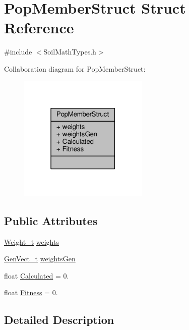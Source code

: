 \hypertarget{struct_pop_member_struct}{}\section{Pop\+Member\+Struct Struct Reference}
\label{struct_pop_member_struct}


{\ttfamily \#include $<$Soil\+Math\+Types.\+h$>$}



Collaboration diagram for Pop\+Member\+Struct\+:\nopagebreak
\begin{figure}[H]
\begin{center}
\leavevmode
\includegraphics[width=175pt]{struct_pop_member_struct__coll__graph}
\end{center}
\end{figure}
\subsection*{Public Attributes}
\begin{DoxyCompactItemize}
\item 
\hyperlink{_soil_math_types_8h_ac56ad2b88186620fd0de0d213aa715dd}{Weight\+\_\+t} \hyperlink{struct_pop_member_struct_aeba960170ef60a906c730cc24cd90367}{weights}
\item 
\hyperlink{_soil_math_types_8h_a1447b70c8b8604a379eb96cdce9d2152}{Gen\+Vect\+\_\+t} \hyperlink{struct_pop_member_struct_a072fadb4863e0cf77b55ad3b46b62522}{weights\+Gen}
\item 
float \hyperlink{struct_pop_member_struct_a8e76eeb476bc89f765b1d872d399fe0c}{Calculated} = 0.
\item 
float \hyperlink{struct_pop_member_struct_a750ec8010731e3e2a876051475c31b14}{Fitness} = 0.
\end{DoxyCompactItemize}


\subsection{Detailed Description}


